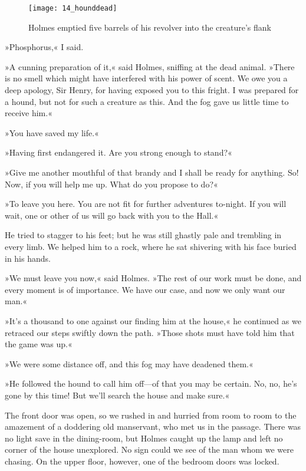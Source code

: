 \begin{figure}[tbph]
\centering
\texttt{[image: 14\_hounddead]}
\caption{Holmes emptied five barrels of his revolver into the creature's flank}
\end{figure}

»Phosphorus,« I said.

»A cunning preparation of it,« said Holmes, sniffing at the dead animal. »There is no smell which might have interfered with his power of scent. We owe you a deep apology, Sir Henry, for having exposed you to this fright. I was prepared for a hound, but not for such a creature as this. And the fog gave us little time to receive him.«

»You have saved my life.«

»Having first endangered it. Are you strong enough to stand?«

»Give me another mouthful of that brandy and I shall be ready for anything. So! Now, if you will help me up. What do you propose to do?«

»To leave you here. You are not fit for further adventures to-night. If you will wait, one or other of us will go back with you to the Hall.«

He tried to stagger to his feet; but he was still ghastly pale and trembling in every limb. We helped him to a rock, where he sat shivering with his face buried in his hands.

»We must leave you now,« said Holmes. »The rest of our work must be done, and every moment is of importance. We have our case, and now we only want our man.«

»It's a thousand to one against our finding him at the house,« he continued as we retraced our steps swiftly down the path. »Those shots must have told him that the game was up.«

»We were some distance off, and this fog may have deadened them.«

»He followed the hound to call him off—of that you may be certain. No, no, he's gone by this time! But we'll search the house and make sure.«

The front door was open, so we rushed in and hurried from room to room to the amazement of a doddering old manservant, who met us in the passage. There was no light save in the dining-room, but Holmes caught up the lamp and left no corner of the house unexplored. No sign could we see of the man whom we were chasing. On the upper floor, however, one of the bedroom doors was locked.

